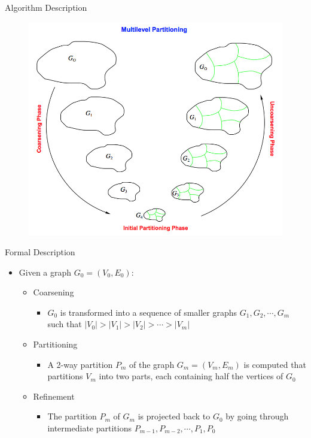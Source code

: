 \documentclass{beamer}
\begin{document}
\begin{frame}{Algorithm Description}
  \begin{center}
  \begin{figure}[htbp]
      \includegraphics[scale=.5]{img/metis.png}
  \end{figure}
  \end{center}
\end{frame}

\begin{frame}{Formal Description}

\begin{itemize}
  \item Given a graph $G_0 = (V_0,E_0)$:
  \begin{itemize}    
    \item Coarsening
    \begin{itemize}
      \item $G_0$ is transformed into a sequence of smaller graphs $G_1,G_2,\cdots,G_m$ such that $|V_0|>|V_1|>|V_2|>\cdots>|V_m|$
    \end{itemize}
    \item Partitioning 
    \begin{itemize}
      \item A 2-way partition $P_m$ of the graph $G_m = (V_m,E_m)$ is computed that partitions $V_m$ into two parts, each containing half the vertices of $G_0$
    \end{itemize}
    \item Refinement
    \begin{itemize}
      \item The partition $P_m$ of $G_m$ is projected back to $G_0$ by going through intermediate partitions $P_{m-1}, P_{m-2},\cdots,P_1,P_0 $
    \end{itemize}
  \end{itemize}
\end{itemize}

\end{frame}
\end{document}
